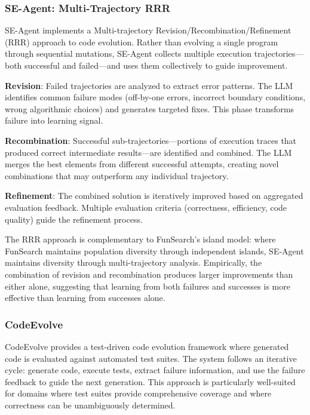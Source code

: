 \subsubsection{SE-Agent: Multi-Trajectory RRR}

SE-Agent implements a Multi-trajectory Revision/Recombination/Refinement (RRR) approach to code evolution. Rather than evolving a single program through sequential mutations, SE-Agent collects multiple execution trajectories---both successful and failed---and uses them collectively to guide improvement.

\textbf{Revision}: Failed trajectories are analyzed to extract error patterns. The LLM identifies common failure modes (off-by-one errors, incorrect boundary conditions, wrong algorithmic choices) and generates targeted fixes. This phase transforms failure into learning signal.

\textbf{Recombination}: Successful sub-trajectories---portions of execution traces that produced correct intermediate results---are identified and combined. The LLM merges the best elements from different successful attempts, creating novel combinations that may outperform any individual trajectory.

\textbf{Refinement}: The combined solution is iteratively improved based on aggregated evaluation feedback. Multiple evaluation criteria (correctness, efficiency, code quality) guide the refinement process.

The RRR approach is complementary to FunSearch's island model: where FunSearch maintains population diversity through independent islands, SE-Agent maintains diversity through multi-trajectory analysis. Empirically, the combination of revision and recombination produces larger improvements than either alone, suggesting that learning from both failures and successes is more effective than learning from successes alone.

\subsubsection{CodeEvolve}

CodeEvolve provides a test-driven code evolution framework where generated code is evaluated against automated test suites. The system follows an iterative cycle: generate code, execute tests, extract failure information, and use the failure feedback to guide the next generation. This approach is particularly well-suited for domains where test suites provide comprehensive coverage and where correctness can be unambiguously determined.

